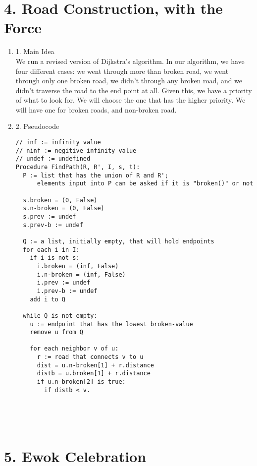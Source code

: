 \documentclass[11pt]{article}
\newenvironment{qparts}{\begin{enumerate}[{(}a{)}]}{\end{enumerate}}
\begin{document}
\section*{4. Road Construction, with the Force}
\begin{qparts}
\item[1.] Main Idea \\
We run a revised version of Dijkstra's algorithm. In our algorithm, we have four different cases: we went through more than broken road, we went through only one broken road, we didn't through any broken road, and we didn't traverse the road to the end point at all. Given this, we have a priority of what to look for. We will choose the one that has the higher priority. We will have one for broken roads, and non-broken road. 
\item[2.] Pseudocode 
\begin{verbatim}
// inf := infinity value
// ninf := negitive infinity value
// undef := undefined
Procedure FindPath(R, R', I, s, t):
  P := list that has the union of R and R';
      elements input into P can be asked if it is "broken()" or not
      
  s.broken = (0, False)
  s.n-broken = (0, False)
  s.prev := undef
  s.prev-b := undef 

  Q := a list, initially empty, that will hold endpoints
  for each i in I:
    if i is not s:
      i.broken = (inf, False)
      i.n-broken = (inf, False)
      i.prev := undef
      i.prev-b := undef
    add i to Q 
    
  while Q is not empty:
    u := endpoint that has the lowest broken-value
    remove u from Q
    
    for each neighbor v of u:
      r := road that connects v to u
      dist = u.n-broken[1] + r.distance
      distb = u.broken[1] + r.distance
      if u.n-broken[2] is true:
        if distb < v.
     
            
          
    
\end{verbatim}
\end{qparts}
\newpage
\section*{5. Ewok Celebration}
\end{document}
